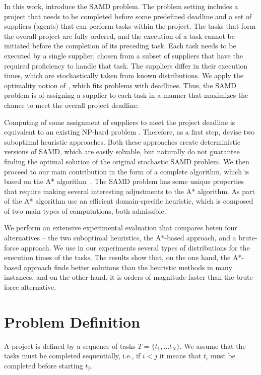 \documentclass[letterpaper]{article} %
\newcommand{\samd}{\ac{SAMD}\xspace}
\newcommand{\astar}{\textsc{A*}\xspace}
\begin{document}
In this work,  introduce the \samd problem.
The problem setting includes a project that needs to be completed before some predefined deadline and a set of suppliers (agents) that can perform tasks within the project. The tasks that form the overall project are fully ordered, and the execution of a task cannot be initiated before the completion of its preceding task.
Each task needs to be executed by a single supplier, chosen from a subset of suppliers that have the required proficiency to handle that task. The suppliers differ in their execution times, which are stochastically taken from known distributions.
We apply the optimality notion of \citeauthor{frank1969shortest}, which fits problems with deadlines.
Thus, the \samd problem is of assigning a supplier to each task in a manner that maximizes the chance to meet the overall project deadline.

Computing of some assignment of suppliers to meet the project deadline is equivalent to an existing NP-hard problem \cite{cohen2015estimating}. Therefore, as a first step,  devise two suboptimal heuristic approaches. Both these approaches create deterministic versions of \samd, which are easily solvable, but naturally do not guarantee finding the optimal solution of the original stochastic \samd problem. We then proceed to our main contribution in the form of a complete algorithm, which is based on the \astar algorithm~\cite{hart1968formal}. The \samd problem has some unique properties that require making several interesting adjustments to the \astar algorithm. As part of the \astar algorithm  use an efficient domain-specific heuristic, which is composed of two main types of computations, both admissible.

We perform an extensive experimental evaluation that compares beten four alternatives -- the two suboptimal heuristics, the \astar-based approach, and a brute-force approach.
We use in our experiments several types of distributions for the execution times of the tasks. The results show that, on the one hand, the \astar-based approach finds better solutions than the heuristic methods in many instances, and on the other hand, it is orders of magnitude faster than the brute-force alternative.

\section{Problem Definition}
\label{sec:def}

A project is defined by a sequence of tasks $T=\{t_1,\ldots t_N\}$. We assume that the tasks must be completed sequentially, i.e., if $i<j$ it means that $t_i$ must be completed before starting $t_j$.
\end{document}
